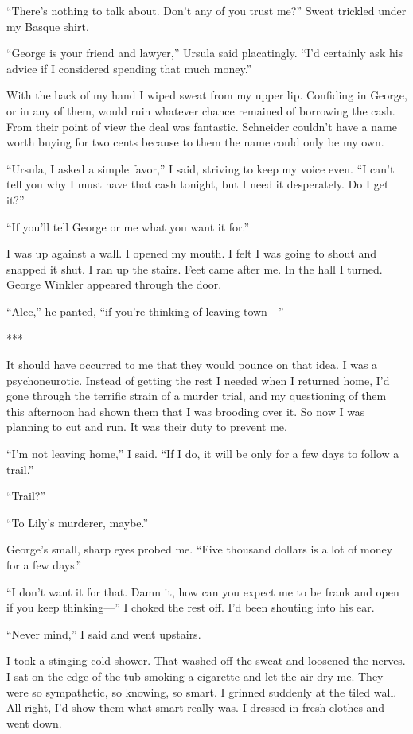 \documentclass{novel}
\begin{document}
{“There’s nothing to talk about. Don’t any of you trust me?” Sweat trickled under my Basque shirt.

“George is your friend and lawyer,” Ursula said placatingly. “I’d certainly ask his advice if I considered spending that much money.”

With the back of my hand I wiped sweat from my upper lip. Confiding in George, or in any of them, would ruin whatever chance remained of borrowing the cash. From their point of view the deal was fantastic. Schneider couldn’t have a name worth buying for two cents because to them the name could only be my own.

“Ursula, I asked a simple favor,” I said, striving to keep my voice even. “I can’t tell you why I must have that cash tonight, but I need it desperately. Do I get it?”

“If you’ll tell George or me what you want it for.”

I was up against a wall. I opened my mouth. I felt I was going to shout and snapped it shut. I ran up the stairs. Feet came after me. In the hall I turned. George Winkler appeared through the door.

“Alec,” he panted, “if you’re thinking of leaving town—”

***

It should have occurred to me that they would pounce on that idea. I was a psychoneurotic. Instead of getting the rest I needed when I returned home, I’d gone through the terrific strain of a murder trial, and my questioning of them this afternoon had shown them that I was brooding over it. So now I was planning to cut and run. It was their duty to prevent me.

“I’m not leaving home,” I said. “If I do, it will be only for a few days to follow a trail.”

“Trail?”

“To Lily’s murderer, maybe.”

George’s small, sharp eyes probed me. “Five thousand dollars is a lot of money for a few days.”

“I don’t want it for that. Damn it, how can you expect me to be frank and open if you keep thinking—” I choked the rest off. I’d been shouting into his ear.

“Never mind,” I said and went upstairs.

I took a stinging cold shower. That washed off the sweat and loosened the nerves. I sat on the edge of the tub smoking a cigarette and let the air dry me. They were so sympathetic, so knowing, so smart. I grinned suddenly at the tiled wall. All right, I’d show them what smart really was. I dressed in fresh clothes and went down.

}
\end{document}
